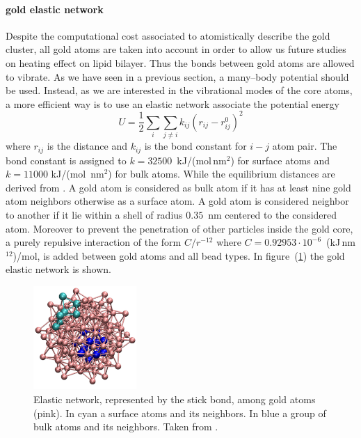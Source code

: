 \paragraph{\textbf{gold elastic network}} Despite the computational cost associated to atomistically describe the gold cluster, all gold atoms are taken into account in order to allow us future studies on heating effect on lipid bilayer. Thus the bonds between gold atoms are allowed to vibrate. As we have seen in a previous section, a many--body potential should be used. Instead, as we are interested in the vibrational modes of the core atoms, 
a more efficient way is to use an elastic network associate the potential energy
\begin{equation*}
	U = \frac{1}{2}\sum_i \sum_{j\ne i}k_{ij}(r_{ij} - r_{ij}^0)^2
\end{equation*}
where $r_{ij}$ is the distance and $k_{ij}$ is the bond constant for $i-j$ atom pair. 
The bond constant is assigned to $k = 32500$~kJ/(mol\,nm$^2$) for surface atoms and $k = 11000$ kJ/(mol\ nm$^2$) for bulk atoms. While the equilibrium distances are derived from \cite{clusterEquilibrium}. A gold atom is considered as bulk atom if it has at least nine gold atom neighbors otherwise as a surface atom. A gold atom is considered neighbor to another if it lie within a shell of radius $0.35$~nm centered to the considered atom. Moreover to prevent the penetration of other particles inside the gold core, a purely repulsive interaction of the form $C/r^{-12}$ where $C = 0.92953\cdot 10^{-6}$~(kJ\,nm$^{12}$)/mol, is added between gold atoms and all \martini bead types. In figure~(\ref{fig:goldNetwork}) the gold elastic network is shown. 
\begin{figure}
	\centering
	\includegraphics[width=0.35\textwidth]{./img/goldNetwork}
	\caption{Elastic network, represented by the stick bond, among gold atoms (pink). In cyan a surface atoms and its neighbors. In blue a group of bulk atoms and its neighbors. Taken from \cite{simonelliThesis}.}
	\label{fig:goldNetwork}
\end{figure}

